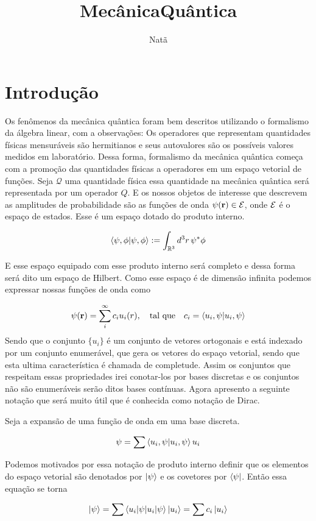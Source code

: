 \documentclass{article}
\title{MecânicaQuântica}
\author{Natã}
\begin{document}
	\maketitle
	\section{Introdução}
	Os fenômenos da mecânica quântica foram bem descritos utilizando o formalismo da álgebra linear, com a observações: Os operadores que representam quantidades físicas mensuráveis são hermitianos e seus autovalores são os possíveis valores medidos em laboratório. Dessa forma, formalismo da mecânica quântica começa com a promoção das quantidades físicas a operadores em um espaço vetorial de funções. Seja \(\mathcal{Q}\) uma quantidade física essa quantidade na mecânica quântica será representada por um operador \(Q\). E os nossos objetos de interesse que descrevem as amplitudes de probabilidade são as funções de onda \(\psi(\bf{r}) \in \cal{E}\), onde \(\cal{E}\) é o espaço de estados. Esse é um espaço dotado do produto interno.
	
	\[\braket{\psi,\phi}:= \int_{\mathbb{R}^3}d^3r \,\psi^*\phi\]
	
	
	
	E esse espaço equipado com esse produto interno será completo e dessa forma será dito um espaço de Hilbert. Como esse espaço é de dimensão infinita podemos expressar nossas funções de onda como
	
	\[\psi(\mathbf{r})=\sum_i ^\infty c_i u_i(r), \quad \text{tal que} \quad c_i=\braket{u_i,\psi}\]
	Sendo que o conjunto \(\{u_i\}\) é um conjunto de vetores ortogonais e está indexado por um conjunto enumerável, que gera os vetores do espaço vetorial, sendo que esta ultima característica é chamada de completude. Assim os conjuntos que respeitam essas propriedades irei conotar-los por bases discretas e os conjuntos não são enumeráveis serão ditos bases contínuas. Agora apresento a seguinte notação que será muito útil que é conhecida como notação de Dirac.
	
	Seja a expansão de uma função de onda em uma base discreta.
	
	\[\psi=\sum \braket{u_i,\psi} u_i\] 
	
	Podemos motivados por essa notação de produto interno definir que os elementos do espaço vetorial são denotados por \(\ket{\psi}\) e os covetores por \(\bra{\psi}\). Então essa equação se torna
	
	\[\ket{\psi}=\sum \braket{u_i|\psi} \ket{u_i}=\sum c_i \ket{u_i}\]
\end{document}
